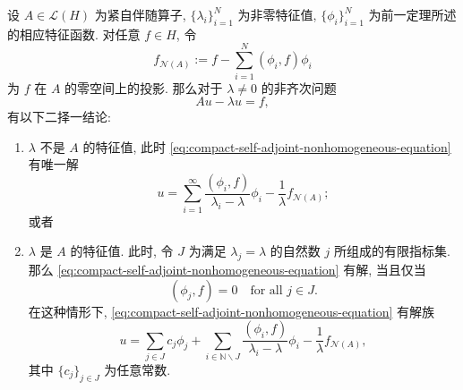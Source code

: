 \begin{Corollary}
\label{cor:compact-self-adjoint-nonhomogeneous-alternative}
设 $A\in\mathcal{L}(H)$ 为紧自伴随算子, $\{\lambda_i\}_{i=1}^N$ 为非零特征值, $\{\phi_i\}_{i=1}^N$ 为前一定理所述的相应特征函数. 对任意 $f\in H$, 令
\begin{equation}\label{eq:hilbert-schmidt-nullspace-data-projection}
f_{\mathcal{N}(A)}:=f-\sum_{i=1}^N(\phi_i,f)\phi_i
\end{equation}
为 $f$ 在 $A$ 的零空间上的投影. 那么对于 $\lambda\ne0$ 的非齐次问题
\begin{equation}\label{eq:compact-self-adjoint-nonhomogeneous-equation}
Au-\lambda u=f,
\end{equation}
有以下二择一结论:\begin{enumerate}\item $\lambda$ 不是 $A$ 的特征值, 此时 \eqref{eq:compact-self-adjoint-nonhomogeneous-equation} 有唯一解
\begin{equation}\label{eq:compact-self-adjoint-noneigenvalue-unique-solution}
u=\sum_{i=1}^\infty\dfrac{(\phi_i,f)}{\lambda_i-\lambda}\phi_i-\dfrac{1}{\lambda}f_{\mathcal{N}(A)};
\end{equation}
或者\item $\lambda$ 是 $A$ 的特征值. 此时, 令 $J$ 为满足 $\lambda_j=\lambda$ 的自然数 $j$ 所组成的有限指标集. 那么 \eqref{eq:compact-self-adjoint-nonhomogeneous-equation} 有解, 当且仅当
\begin{equation}\label{eq:compact-self-adjoint-eigenvalue-solvability-condition}
(\phi_j,f)=0\quad\text{for all }j\in J.
\end{equation}
在这种情形下, \eqref{eq:compact-self-adjoint-nonhomogeneous-equation} 有解族
\begin{equation}\label{eq:compact-self-adjoint-eigenvalue-solution-family}
u=\sum_{j\in J}c_j\phi_j+\sum_{i\in\mathbb{N}\backslash J}\dfrac{(\phi_i,f)}{\lambda_i-\lambda}\phi_i-\dfrac{1}{\lambda}f_{\mathcal{N}(A)},
\end{equation}
其中 $\{c_j\}_{j\in J}$ 为任意常数.\end{enumerate}
\end{Corollary}

\begingroup
{}
\renewcommand{\endProof}{\par\nobreak\hfill$\blacksquare$\par\vspace{0.1cm}}
\endgroup
